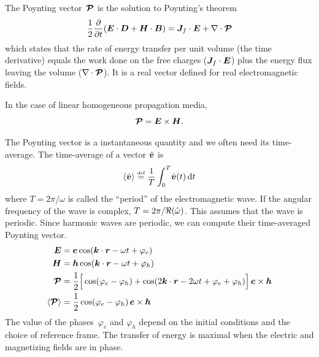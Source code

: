 The Poynting vector~$\bm{\mathcal{P}}$ is the solution to Poynting's theorem
\begin{equation}
    \frac{1}{2}\frac{\partial}{\partial t}
    \left(
        \vect{E} \cdot \vect{D} + \vect{H} \cdot \vect{B}
    \right)
    =
    \vect{J}_f \cdot \vect{E}
    +
    \nabla \cdot \vect{\power{P}}
    \label{eq:poynting_theorem}
\end{equation}
which states that the rate of energy transfer per unit volume (the time derivative)
equals the work done on the free charges ($\bm{J}_f \cdot \bm{E}$)
plus the energy flux leaving the volume ($\nabla \cdot \bm{\mathcal{P}}$).
It is a real vector defined for real electromagnetic fields.

In the case of linear homogeneous propagation media,
\begin{equation}
    \bm{\mathcal{P}} = \bm{E} \times \bm{H}
    \text{.}
    \label{eq:poynting_vector}
\end{equation}

The Poynting vector is a instantaneous quantity and we often need its time-average.
The time-average of a vector $\hat{\bm{v}}$ is
\begin{equation}
    \Timeavg{\vectcp{v}}
    \equaldef
    \frac{1}{T}
    \int_0^T \! \vectcp{v}(t)\, \mathrm{d}t
    \label{eq:def_time_average}
\end{equation}
where $T=2\pi/\omega$ is called the ``period'' of the electromagnetic wave.
If the angular frequency of the wave is complex, $T=2\pi/\Re(\hat{\omega})$.
This assumes that the wave is periodic.
Since harmonic waves are periodic, we can compute their time-averaged Poynting vector.
\begin{align}
    \vect{E} &= \vect{e} \cos(\vect{k}\cdot\vect{r} - \omega t + \varphi_e)
    \\
    \vect{H} &= \vect{h} \cos(\vect{k}\cdot\vect{r} - \omega t + \varphi_h)
    \\
    \vect{\power{P}} &=
    \frac{1}{2}
    \Big[
        \cos(\varphi_e - \varphi_h)
        +
        \cos(2\vect{k}\cdot\vect{r} - 2\omega t + \varphi_e + \varphi_h)
    \Big]
    \,
    \vect{e} \times \vect{h}
    \\
    \Timeavg{\vect{\power{P}}}
    &=
    \frac{1}{2} \cos(\varphi_e - \varphi_h) \, \vect{e} \times \vect{h}
\end{align}
The value of the phases~$\varphi_e$ and $\varphi_h$ depend on the initial conditions and the choice of reference frame.
The transfer of energy is maximal when the electric and magnetizing fields are in phase.

